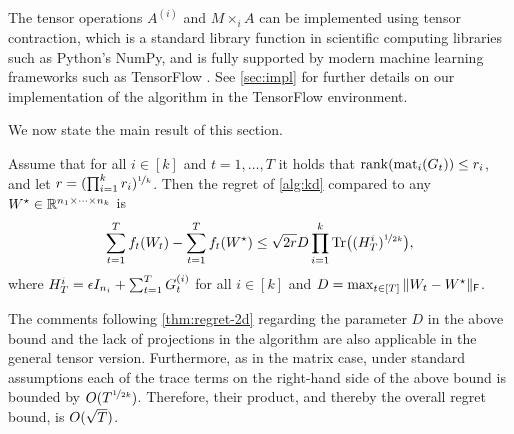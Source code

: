 \begin{algorithm}[t]
\caption{\NAME, general tensor case.}
\label{alg:kd}
\end{algorithm}

The tensor operations $A^{(i)}$ and $M \times_i A$ can be implemented using tensor contraction,
which is a standard library function in scientific computing libraries such as Python's NumPy, and is fully supported by modern machine learning frameworks such as TensorFlow \citep{tensorflow}.
See \cref{sec:impl} for further details on our implementation of the algorithm in the TensorFlow environment.


We now state the main result of this section.

\begin{theorem} \label{thm:sham-kd}
Assume that for all $i \in [k]$ and $t=1,\ldots,T$ it holds that $\mathrm{rank}(\mathrm{mat}_{i}(G_t)) \le r_i$, and let $r = (\prod_{i=1}^{k} r_i)^{\nicefrac{1}{k}}$.
Then the regret of \cref{alg:kd} compared to any $W^\star \in \mathbb{R}^{n_1 \times \cdots \times n_k}$ is
\begin{align*}
\sum_{t=1}^T f_t(W_t) - \sum_{t=1}^T f_t(W^\star)
\le
\sqrt{2r}D \prod_{i=1}^k \operatorname*{Tr}\mathopen{}\big((H_T^{i})^{\nicefrac{1}{2k}}\big)
,
\end{align*}
where $H_T^i = \epsilon I_{n_i} + \sum_{t=1}^T G_t^{(i)}$ for all $i \in [k]$ and
 $D = \max_{t \in [T]} \|W_t-W^\star\|_{\mathsf{F}}$.
\end{theorem}

The comments following \cref{thm:regret-2d} regarding the parameter $D$ in the above bound and the lack of projections in the algorithm are also applicable in the general tensor version.
Furthermore, as in the matrix case, under standard assumptions each of the trace terms on the right-hand side of the above bound is bounded by $O(T^{\nicefrac{1}{2k}})$. Therefore, their product, and thereby the overall regret bound, is $O(\sqrt{T})$.


